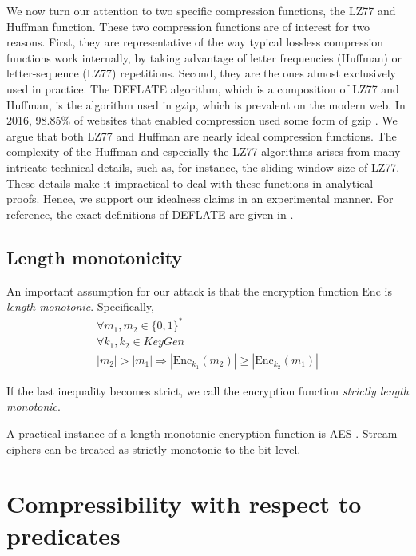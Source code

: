\documentclass[conference, letterpaper, 10pt]{IEEEtran}
\begin{document}
We now turn our attention to two specific compression functions, the
LZ77 and Huffman function. These two compression functions are of
interest for two reasons. First, they are representative of the way
typical lossless compression functions work internally, by taking
advantage of letter frequencies (Huffman) or letter-sequence (LZ77)
repetitions. Second, they are the ones almost exclusively used in
practice. The DEFLATE algorithm, which is a composition of LZ77 and
Huffman, is the algorithm used in gzip, which is prevalent on the
modern web. In 2016, 98.85\% of websites that enabled compression used
some form of gzip \cite{c19}. We argue that both LZ77 and Huffman are nearly
ideal compression functions. The complexity of the Huffman and
especially the LZ77 algorithms arises from many intricate technical
details, such as, for instance, the sliding window size of LZ77. These
details make it impractical to deal with these functions in analytical
proofs. Hence, we support our idealness claims in an experimental
manner. For reference, the exact definitions of DEFLATE are given in
\cite{c12}.


\subsection{Length monotonicity}\label{subsec:lenmonotone}

An important assumption for our attack is that the encryption function
$\textrm{Enc}$ is
\textit{length monotonic}. Specifically,
\begin{equation*}
\begin{split}
\forall m_1, m_2 \in \{0, 1\}^*\\
\forall k_1, k_2 \in KeyGen\\
|m_2| > |m_1|
\Rightarrow
|\textrm{Enc}_{k_1}(m_2)| \geq |\textrm{Enc}_{k_2}(m_1)|
\end{split}
\end{equation*}

If the last inequality becomes strict, we call the encryption function
\textit{strictly length monotonic}.

A practical instance of a length monotonic encryption function is AES \cite{c8}.
Stream ciphers can be treated as strictly monotonic to the bit level.

\section{Compressibility with respect to predicates}\label{sec:propertycom}
\end{document}

